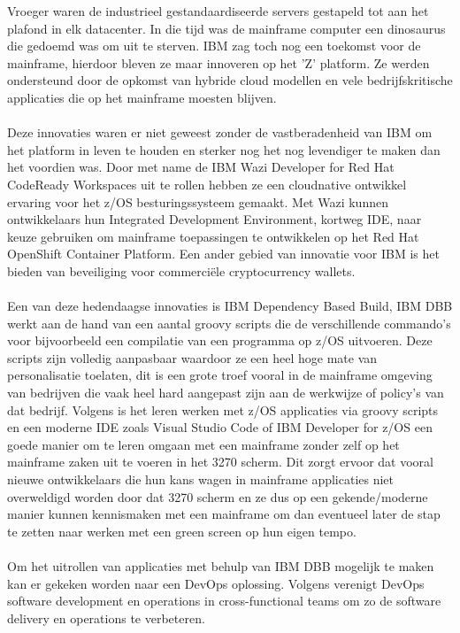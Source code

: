 Vroeger waren de industrieel gestandaardiseerde servers gestapeld tot aan het plafond in elk datacenter.
In die tijd was de mainframe computer een dinosaurus die gedoemd was om uit te sterven.
IBM zag toch nog een toekomst voor de mainframe, hierdoor bleven ze maar innoveren op het 'Z' platform.
Ze werden ondersteund door de opkomst van hybride cloud modellen en vele bedrijfskritische applicaties die op het mainframe moesten blijven. \autocite{Moorhead2022}
\\ \\
Deze innovaties waren er niet geweest zonder de vastberadenheid van IBM om het platform in leven te houden en sterker nog het nog levendiger te maken dan het voordien was.
Door met name de IBM Wazi Developer for Red Hat CodeReady Workspaces uit te rollen hebben ze een cloudnative ontwikkel ervaring voor het z/OS besturingssysteem gemaakt.
Met Wazi kunnen ontwikkelaars hun Integrated Development Environment, kortweg IDE, naar keuze gebruiken om mainframe toepassingen te ontwikkelen op het Red Hat OpenShift Container Platform.
Een ander gebied van innovatie voor IBM is het bieden van beveiliging voor commerciële cryptocurrency wallets. \autocite{Bloomberg2021}
\\ \\
Een van deze hedendaagse innovaties is IBM Dependency Based Build, IBM DBB werkt aan de hand van een aantal groovy scripts die de verschillende commando's voor bijvoorbeeld een compilatie van een programma op z/OS uitvoeren.
Deze scripts zijn volledig aanpasbaar waardoor ze een heel hoge mate van personalisatie toelaten, dit is een grote troef vooral in de mainframe omgeving van bedrijven die vaak heel hard aangepast zijn aan de werkwijze of policy's van dat bedrijf.
Volgens \textcite{Porter2019} is het leren werken met z/OS applicaties via groovy scripts en een moderne IDE zoals Visual Studio Code of IBM Developer for z/OS een goede manier om te leren omgaan met een mainframe zonder zelf op het mainframe zaken uit te voeren in het 3270 scherm.
Dit zorgt ervoor dat vooral nieuwe ontwikkelaars die hun kans wagen in mainframe applicaties niet overweldigd worden door dat 3270 scherm en ze dus op een gekende/moderne manier kunnen kennismaken met een mainframe om dan eventueel later de stap te zetten naar werken met een green screen op hun eigen tempo. \autocite{Porter2019}
\\ \\
Om het uitrollen van applicaties met behulp van IBM DBB mogelijk te maken kan er gekeken worden naar een DevOps oplossing.
Volgens \textcite{Sokolowksi2021} verenigt DevOps software development en operations in cross-functional teams om zo de software delivery en operations te verbeteren.
